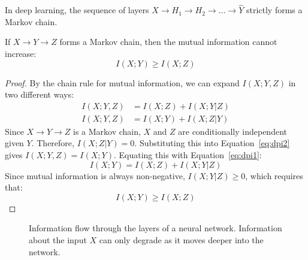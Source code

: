 In deep learning, the sequence of layers $X \to H_1 \to H_2 \to \dots \to \hat{Y}$ strictly forms a Markov chain.

\begin{theorem}
\label{thm:dpi}
If $X \to Y \to Z$ forms a Markov chain, then the mutual information cannot increase:
\begin{equation}
    I(X; Y) \geq I(X; Z)
\end{equation}
\end{theorem}

\begin{proof}
By the chain rule for mutual information, we can expand $I(X; Y, Z)$ in two different ways:
\begin{align}
    I(X; Y, Z) &= I(X; Z) + I(X; Y | Z) \label{eq:dpi1} \\
    I(X; Y, Z) &= I(X; Y) + I(X; Z | Y) \label{eq:dpi2}
\end{align}
Since $X \to Y \to Z$ is a Markov chain, $X$ and $Z$ are conditionally independent given $Y$. Therefore, $I(X; Z | Y) = 0$.
Substituting this into Equation~\ref{eq:dpi2} gives $I(X; Y, Z) = I(X; Y)$.
Equating this with Equation~\ref{eq:dpi1}:
\begin{equation}
    I(X; Y) = I(X; Z) + I(X; Y | Z)
\end{equation}
Since mutual information is always non-negative, $I(X; Y | Z) \geq 0$, which requires that:
\begin{equation}
    I(X; Y) \geq I(X; Z)
\end{equation}
\end{proof}

\begin{figure}[ht]
    \centering
    \caption{Information flow through the layers of a neural network. Information about the input $X$ can only degrade as it moves deeper into the network.}
    \label{fig:dpi_network}
\end{figure}

